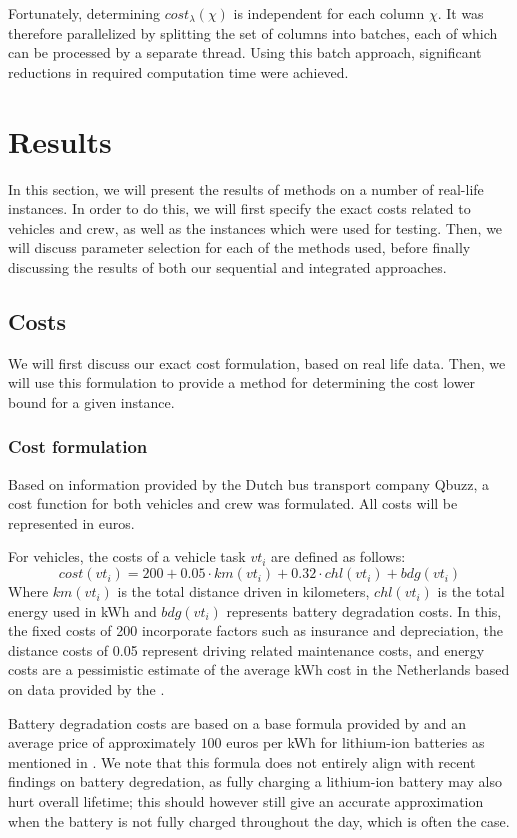 \documentclass[]{article}
\begin{document}
Fortunately, determining $cost_\lambda(\chi)$ is independent for each column $\chi$. It was therefore parallelized by splitting the set of columns into batches, each of which can be processed by a separate thread. Using this batch approach, significant reductions in required computation time were achieved.

\section{Results}
In this section, we will present the results of methods on a number of real-life instances. In order to do this, we will first specify the exact costs related to vehicles and crew, as well as the instances which were used for testing. Then, we will discuss parameter selection for each of the methods used, before finally discussing the results of both our sequential and integrated approaches.

\subsection{Costs} \label{sec:results-costs}
We will first discuss our exact cost formulation, based on real life data. Then, we will use this formulation to provide a method for determining the cost lower bound for a given instance. 

\subsubsection{Cost formulation}
Based on information provided by the Dutch bus transport company Qbuzz, a cost function for both vehicles and crew was formulated. All costs will be represented in euros. 

For vehicles, the costs of a vehicle task $vt_i$ are defined as follows:
\begin{equation}
cost(vt_i) = 200 + 0.05 \cdot km(vt_i) + 0.32 \cdot chl(vt_i) + bdg(vt_i)  \nonumber
\end{equation}
Where $km(vt_i)$ is the total distance driven in kilometers, $chl(vt_i)$ is the total energy used in kWh and $bdg(vt_i)$ represents battery degradation costs. In this, the fixed costs of 200 incorporate factors such as insurance and depreciation, the distance costs of 0.05 represent driving related maintenance costs, and energy costs are a pessimistic estimate of the average kWh cost in the Netherlands based on data provided by the \citet{ANWB2025}.

Battery degradation costs are based on a base formula provided by \citet{vanKootenNiekerk2017} and an average price of approximately $100$ euros per kWh for lithium-ion batteries as mentioned in \citet{Ocatsaros2024}. We note that this formula does not entirely align with recent findings on battery degredation, as fully charging a lithium-ion battery may also hurt overall lifetime; this should however still give an accurate approximation when the battery is not fully charged throughout the day, which is often the case. 
\end{document}
